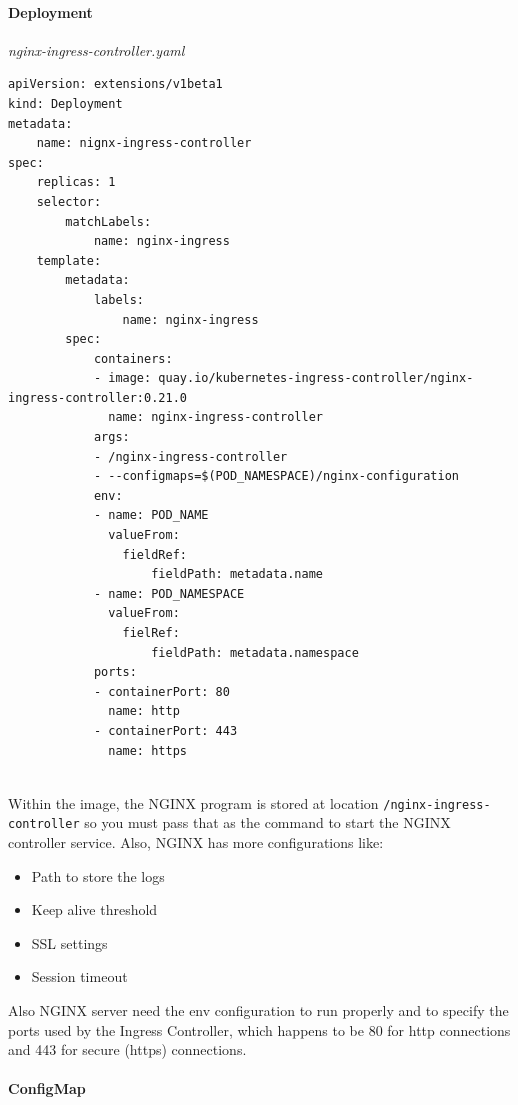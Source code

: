 \documentclass{article}
\newenvironment{codetemplate}[1][]{%
  \mybasecolorbox[#1]
  \itshape
}{%
  \endmybasecolorbox
}
\begin{document}
\paragraph{Deployment}

\begin{codetemplate}{nginx-ingress-controller.yaml}
\begin{verbatim}
apiVersion: extensions/v1beta1
kind: Deployment
metadata:
    name: nignx-ingress-controller
spec:
    replicas: 1
    selector:
        matchLabels:
            name: nginx-ingress
    template:
        metadata:
            labels:
                name: nginx-ingress
        spec:
            containers:
            - image: quay.io/kubernetes-ingress-controller/nginx-ingress-controller:0.21.0
              name: nginx-ingress-controller
            args:
            - /nginx-ingress-controller
            - --configmaps=$(POD_NAMESPACE)/nginx-configuration
            env:
            - name: POD_NAME
              valueFrom:
                fieldRef:
                    fieldPath: metadata.name
            - name: POD_NAMESPACE
              valueFrom:
                fielRef:
                    fieldPath: metadata.namespace
            ports:
            - containerPort: 80
              name: http
            - containerPort: 443
              name: https
            
\end{verbatim}
\end{codetemplate}

Within the image, the NGINX program is stored at location \verb|/nginx-ingress-controller| so you must pass that as the command to start the NGINX controller service. Also, NGINX has more configurations like:
\begin{itemize}
    \item Path to store the logs
    \item Keep alive threshold
    \item SSL settings
    \item Session timeout
\end{itemize}

Also NGINX server need the env configuration to run properly and to specify the ports used by the Ingress Controller, which happens to be 80 for http connections and 443 for secure (https) connections.

\paragraph{ConfigMap}
\end{document}
